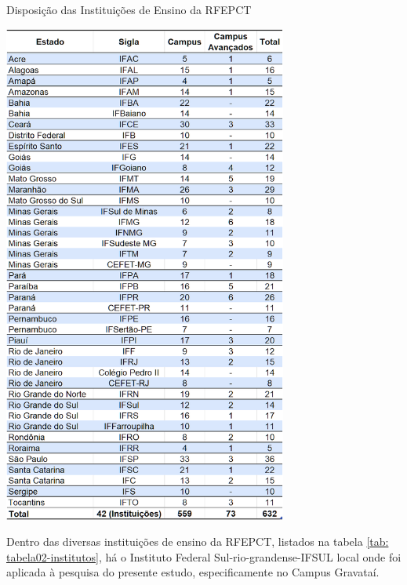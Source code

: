 \graphicspath{{tabelas/}}
\begin{table}[!ht]
\centering
\begin{minipage}{1.\textwidth}
\caption{Disposição das Instituições de Ensino da RFEPCT}
\centering
\includegraphics[width=0.7\textwidth]{tabela02-institutos.png}
\label{tab: tabela02-institutos}
\end{minipage}
\end{table}

Dentro das diversas instituições de ensino da RFEPCT, listados na tabela \ref{tab: tabela02-institutos}, há o Instituto Federal Sul-rio-grandense-IFSUL local onde foi aplicada à pesquisa do presente estudo, especificamente no Campus Gravataí.

